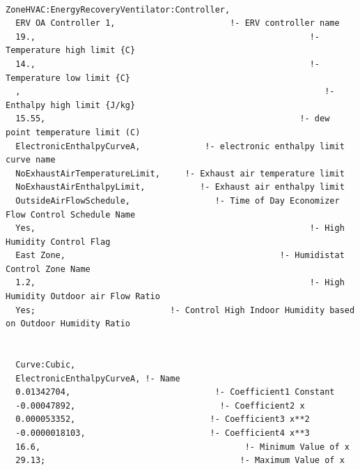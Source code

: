 \begin{lstlisting}

ZoneHVAC:EnergyRecoveryVentilator:Controller,
  ERV OA Controller 1,                       !- ERV controller name
  19.,                                                       !- Temperature high limit {C}
  14.,                                                       !- Temperature low limit {C}
  ,                                                             !- Enthalpy high limit {J/kg}
  15.55,                                                   !- dew point temperature limit (C)
  ElectronicEnthalpyCurveA,             !- electronic enthalpy limit curve name
  NoExhaustAirTemperatureLimit,     !- Exhaust air temperature limit
  NoExhaustAirEnthalpyLimit,           !- Exhaust air enthalpy limit
  OutsideAirFlowSchedule,                 !- Time of Day Economizer Flow Control Schedule Name
  Yes,                                                       !- High Humidity Control Flag
  East Zone,                                           !- Humidistat Control Zone Name
  1.2,                                                       !- High Humidity Outdoor air Flow Ratio
  Yes;                           !- Control High Indoor Humidity based on Outdoor Humidity Ratio


  Curve:Cubic,
  ElectronicEnthalpyCurveA, !- Name
  0.01342704,                             !- Coefficient1 Constant
  -0.00047892,                             !- Coefficient2 x
  0.000053352,                           !- Coefficient3 x**2
  -0.0000018103,                         !- Coefficient4 x**3
  16.6,                                         !- Minimum Value of x
  29.13;                                       !- Maximum Value of x
\end{lstlisting}
